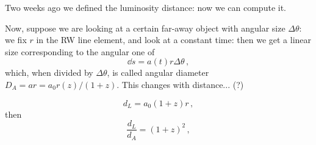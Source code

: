 \documentclass[main.tex]{subfiles}
\begin{document}
Two weeks ago we defined the luminosity distance: now we can compute it.


Now,  suppose we are looking at a certain far-away object with angular size \(\Delta \theta \): we fix \(r\) in the RW line element, and look at a constant time: then we get a linear size corresponding to the angular one of 
%
\begin{equation}
  \dd{s}  = a(t) r \Delta \theta 
\,,
\end{equation}
%
which, when divided by \(\Delta \theta \), is called angular diameter \(D_A = a r = a_0 r(z) / (1+z)\).
This changes with distance... (?) 

\begin{equation}
 d_L = a_0 (1+z) r
\,,
\end{equation}
%
then 
%
\begin{equation}
  \frac{d_L}{d_A} = (1+z)^2
\,,
\end{equation}
%
\end{document}
